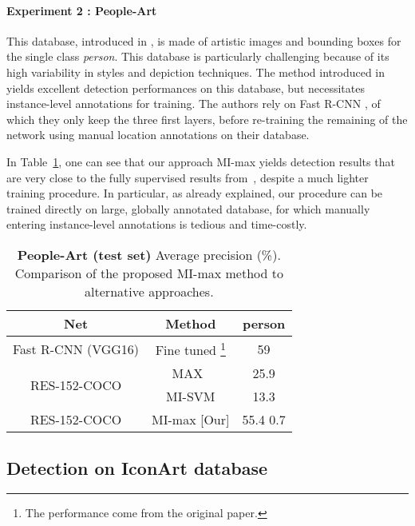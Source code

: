 \documentclass[runningheads]{llncs}
\newcommand\NB{IconArt} \newcommand\MIL{MI-max}
\newcommand\MILS{MI-max}
\newcommand\MAX{MAX}
\begin{document}
\paragraph{\bf Experiment 2 : People-Art} This database, introduced in \cite{westlake_detecting_2016}, is made of artistic images and bounding boxes for the single class {\it person}. This database is particularly challenging because of its high variability in styles and depiction techniques. The method introduced in~\cite{westlake_detecting_2016} yields excellent detection performances on this database, but necessitates instance-level annotations for training. The authors rely on Fast R-CNN \cite{girshick_fast_2015}, of which they only keep the three first layers, before re-training the remaining of the network using manual location annotations on their database.

In Table~\ref{tab:People-Art_detection}, one can see that our approach MI-max yields detection results that are very close to the fully supervised results from~\cite{westlake_detecting_2016}, despite a much lighter training procedure. In particular, as already explained, our procedure can be trained directly on large, globally annotated database, for which manually entering instance-level annotations is tedious and time-costly. 
\begin{savenotes}
\begin{table}
\centering
\caption{\textbf{People-Art (test set)} Average precision (\%). Comparison of the proposed \MILS{} method to alternative approaches.}
\label{tab:People-Art_detection}
\begin{tabular}{|c|c|c|}
Net & Method & person \\
\hline
\hline 
Fast R-CNN (VGG16)  & Fine tuned \cite{westlake_detecting_2016}\footnote{The performance come from the original paper.} &  59 \\
\hline
\multirow{2}{*}{RES-152-COCO}  & \MAX{}~\cite{crowley_art_2016}  & 25.9 \\
& MI-SVM \cite{andrews_support_2003} & 13.3  \\
\hline \hline
 RES-152-COCO & \MILS{}   [Our]  & 55.4   0.7 \\
\end{tabular}

 \end{table}  
 \end{savenotes}

 


\subsection{Detection on \NB{} database}
\label{sec:iconart}
\end{document}
